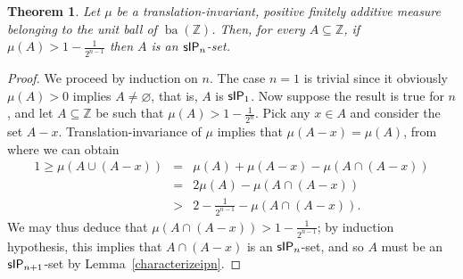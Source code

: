 \documentclass{jloganal}
\newtheorem{thm}{Theorem}[section]    %
\theoremstyle{definition}
\newcommand{\ba}{\mathop{\mathrm{ba}}}
\newcommand{\sip}{\mathnormal{\mathsf{sIP}}}
\begin{document}
\begin{thm}\label{translationinvariant}
Let $\mu$ be a translation-invariant, positive finitely additive measure belonging to the unit ball of $\ba(\mathbb Z)$. Then, for every $A\subseteq\mathbb Z$, if $\mu(A)>1-\frac{1}{2^{n-1}}$ then $A$ is an $\sip_{n}$-set.
\end{thm}
\begin{proof}
We proceed by induction on $n$. The case $n=1$ is trivial since it obviously $\mu(A)>0$ implies $A\neq\varnothing$, that is, $A$ is $\sip_1$. Now suppose the result is true for $n$, and let $A\subseteq\mathbb Z$ be such that $\mu(A)>1-\frac{1}{2^n}$. Pick any $x\in A$ and consider the set $A-x$. Translation-invariance of $\mu$ implies that $\mu(A-x)=\mu(A)$, from where we can obtain
\begin{eqnarray*}
    1\geq \mu(A\cup(A-x)) & = & \mu(A)+\mu(A-x)-\mu(A\cap(A-x)) \\
    & = & 2\mu(A)-\mu(A\cap(A-x)) \\
    & > & 2-\frac{1}{2^{n-1}}-\mu(A\cap(A-x)).
\end{eqnarray*}
We may thus deduce that $\mu(A\cap(A-x))>1-\frac{1}{2^{n-1}}$; by induction hypothesis, this implies that $A\cap(A-x)$ is an $\sip_n$-set, and so $A$ must be an $\sip_{n+1}$-set by Lemma~\ref{characterizeipn}.

\end{proof}
\end{document}
